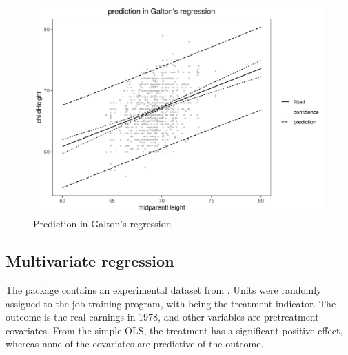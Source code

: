 \begin{figure}[ht]
\centering
\includegraphics[width = \textwidth]{figures/galton_prediction_ggplot.pdf}
\caption{Prediction in Galton's regression}\label{fig::prediction-galton}
\end{figure}


\subsection{Multivariate regression}\label{section::normal-lm-lalonde}


The  package  contains an experimental dataset  from \citet{lalonde1986evaluating}. Units were randomly assigned to the job training program, with  being the treatment indicator. The outcome  is the real earnings in 1978, and other variables are pretreatment covariates. From the simple OLS, the treatment has a significant positive effect, whereas none of the covariates are predictive of the outcome. 


